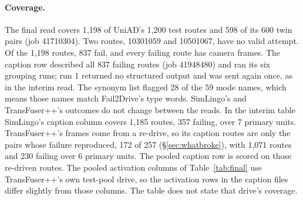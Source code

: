 \paragraph{Coverage.}
The final read covers 1,198 of UniAD's 1,200 test routes and 598 of its 600
twin pairs (job 41710304). Two routes, 10301059 and 10501067, have no valid
attempt. Of the 1,198 routes, 837 fail, and every failing route has camera
frames.
The caption row described all 837 failing routes (job 41948480) and ran its six
grouping runs; run 1 returned no structured output and was sent again once, as
in the interim read. The synonym list flagged 28 of the 59 mode names, which
means those names match Fail2Drive's type words.
SimLingo's and TransFuser++'s outcomes do not change between the reads. In the
interim table SimLingo's caption column covers 1,185 routes, 357 failing, over 7
primary units. TransFuser++'s frames come from a re-drive, so its caption routes
are only the pairs whose failure reproduced, 172 of 257 (\S\ref{sec:whatbroke}),
with 1,071 routes and 230 failing over 6 primary units. The pooled caption row
is scored on those re-driven routes. %
The pooled activation columns of
Table~\ref{tab:final} use TransFuser++'s own test-pool drive, so the activation
rows in the caption files differ slightly from those columns. The table does not
state that drive's coverage.


